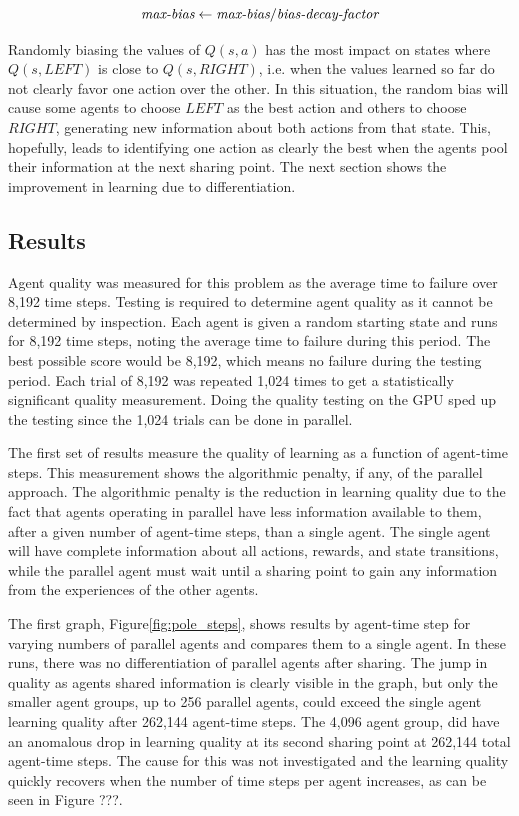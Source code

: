 \begin{flushleft}
\begin{equation}
\mbox{\it max-bias} \gets \mbox{\it max-bias} / \mbox{\it bias-decay-factor}
\end{equation}

Randomly biasing the values of $Q(s,a)$ has the most impact on states where $Q(s,LEFT)$ is close to $Q(s,RIGHT)$, i.e. when the values learned so far do not clearly favor one action over the other.  In this situation, the random bias will cause some agents to choose $LEFT$ as the best action and others to choose $RIGHT$, generating new information about both actions from that state.  This, hopefully, leads to identifying one action as clearly the best when the agents pool their information at the next sharing point.  The next section shows the improvement in learning due to differentiation.

\subsection{Results}
Agent quality was measured for this problem as the average time to failure over 8,192 time steps.  Testing is required to determine agent quality as it cannot be determined by inspection.  Each agent is given a random starting state and runs for 8,192 time steps, noting the average time to failure during this period.  The best possible score would be 8,192, which means no failure during the testing period.  Each trial of 8,192 was repeated 1,024 times to get a statistically significant quality measurement.  Doing the quality testing on the GPU sped up the testing since the 1,024 trials can be done in parallel.

The first set of results measure the quality of learning as a function of agent-time steps.  This measurement shows the algorithmic penalty, if any, of the parallel approach.  The algorithmic penalty is the reduction in learning quality due to the fact that agents operating in parallel have less information available to them, after a given number of agent-time steps, than a single agent.  The single agent will have complete information about all actions, rewards, and state transitions, while the parallel agent must wait until a sharing point to gain any information from the experiences of the other agents.

The first graph, Figure\ref{fig:pole_steps}, shows results by agent-time step for varying numbers of parallel agents and compares them to a single agent.  In these runs, there was no differentiation of parallel agents after sharing.  The jump in quality as agents shared information is clearly visible in the graph, but only the smaller agent groups, up to 256 parallel agents, could exceed the single agent learning quality after 262,144 agent-time steps.  The 4,096 agent group, did have an anomalous drop in learning quality at its second sharing point at 262,144 total agent-time steps.  The cause for this was not investigated and the learning quality quickly recovers when the number of time steps per agent increases, as can be seen in Figure ???.

\end{flushleft}

